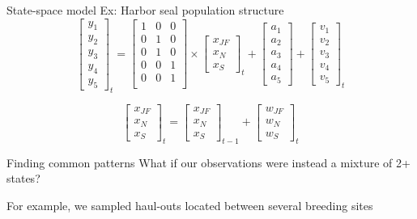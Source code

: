 \documentclass[
  ignorenonframetext,
]{beamer}
\begin{document}
\begin{frame}{State-space model \textbar{} Ex: Harbor seal population
structure}
\protect\hypertarget{state-space-model-ex-harbor-seal-population-structure}{}
\[
\begin{bmatrix}
 y_1 \\
 y_2 \\
 y_3 \\
 y_4 \\
 y_5 
\end{bmatrix}_t =
\begin{bmatrix}
 1 & 0 & 0 \\
 0 & 1 & 0 \\
 0 & 1 & 0 \\
 0 & 0 & 1 \\
 0 & 0 & 1 \\
\end{bmatrix} \times
\begin{bmatrix}
 x_{JF} \\
 x_N \\
 x_S 
\end{bmatrix}_t +
\begin{bmatrix}
 a_1 \\
 a_2 \\
 a_3 \\
 a_4 \\
 a_5 
\end{bmatrix} +
\begin{bmatrix}
 v_1 \\
 v_2 \\
 v_3 \\
 v_4 \\
 v_5 
\end{bmatrix}_t
\]

\[
\begin{bmatrix}
 x_{JF} \\
 x_N \\
 x_S 
\end{bmatrix}_t =
\begin{bmatrix}
 x_{JF} \\
 x_N \\
 x_S 
\end{bmatrix}_{t-1} +
\begin{bmatrix}
 w_{JF} \\
 w_N \\
 w_S
\end{bmatrix}_t
\]
\end{frame}

\begin{frame}{Finding common patterns}
\protect\hypertarget{finding-common-patterns}{}
What if our observations were instead a mixture of 2+ states?

For example, we sampled haul-outs located between several breeding sites
\end{frame}
\end{document}
